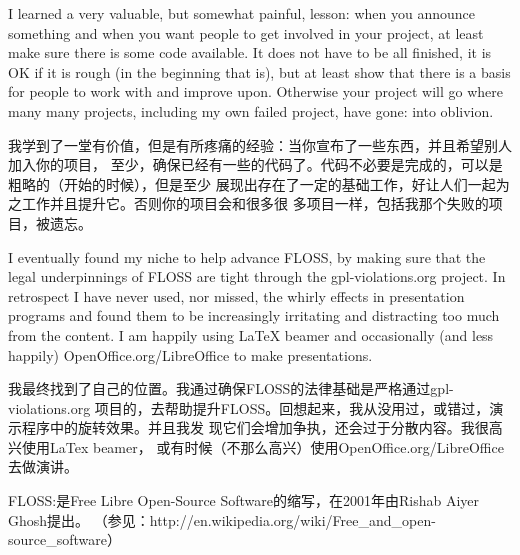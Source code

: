 I learned a very valuable, but somewhat painful, lesson: when you announce
something and when you want people to get involved in your project, at least
make sure there is some code available. It does not have to be all finished, it
is OK if it is rough (in the beginning that is), but at least show that there is
a basis for people to work with and improve upon. Otherwise your project will go
where many many projects, including my own failed project, have gone: into
oblivion.

我学到了一堂有价值，但是有所疼痛的经验：当你宣布了一些东西，并且希望别人加入你的项目，
至少，确保已经有一些的代码了。代码不必要是完成的，可以是粗略的（开始的时候），但是至少
展现出存在了一定的基础工作，好让人们一起为之工作并且提升它。否则你的项目会和很多很
多项目一样，包括我那个失败的项目，被遗忘。


I eventually found my niche to help advance FLOSS, by making sure that the legal
underpinnings of FLOSS are tight through the gpl-violations.org project. In
retrospect I have never used, nor missed, the whirly effects in presentation
programs and found them to be increasingly irritating and distracting too much
from the content. I am happily using LaTeX beamer and occasionally (and less
happily) OpenOffice.org/LibreOffice to make presentations.

我最终找到了自己的位置。我通过确保FLOSS的法律基础是严格通过gpl-violations.org
项目的，去帮助提升FLOSS。回想起来，我从没用过，或错过，演示程序中的旋转效果。并且我发
现它们会增加争执，还会过于分散内容。我很高兴使用LaTex beamer，
或有时候（不那么高兴）使用OpenOffice.org/LibreOffice 去做演讲。


FLOSS:是Free Libre Open-Source Software的缩写，在2001年由Rishab Aiyer Ghosh提出。
（参见：http://en.wikipedia.org/wiki/Free_and_open-source_software）

